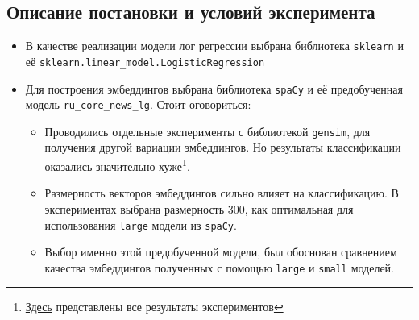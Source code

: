 \documentclass{article}
\begin{document}
\subsection{Описание постановки и условий эксперимента}
\begin{itemize}
    \item[\circ] В качестве реализации модели лог регрессии выбрана библиотека \texttt{sklearn} и её \texttt{sklearn.linear\_model.LogisticRegression}
    \item[\circ] Для построения эмбеддингов выбрана библиотека \texttt{spaCy} и её предобученная модель \texttt{ru\_core\_news\_lg}. Стоит оговориться:
    \begin{itemize}
        \item Проводились отдельные эксперименты с библиотекой \texttt{gensim}, для получения другой вариации эмбеддингов. Но результаты классификации оказались значительно хуже\footnote{\href{https://github.com/intsystems/2024-Project-142/blob/master/code}{Здесь} представлены все результаты экспериментов}.
        \item Размерность векторов эмбеддингов сильно влияет на классификацию. В экспериментах выбрана размерность 300, как оптимальная для использования \texttt{large} модели из \texttt{spaCy}.
        \item Выбор именно этой предобученной модели, был обоснован сравнением качества эмбеддингов полученных с помощью \texttt{large} и \texttt{small} моделей.%
    \end{itemize}
    
\end{itemize}
\end{document}
